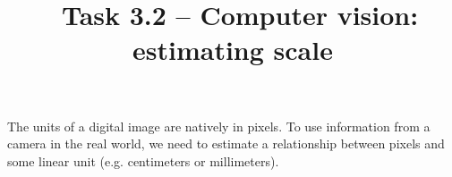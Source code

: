 \documentclass{tufte-handout}
\title{\usnaCourseNumber\ Task 3.2 -- Computer vision: estimating scale}
\author{\usnaInstructorShort}
\date{\printdate{\courseWeekTwo}}
\begin{document}
\maketitle
The units of a digital image are natively in pixels. To use information from a camera in the real world, we need to estimate a relationship between pixels and some linear unit (e.g. centimeters or millimeters).
\end{document}
